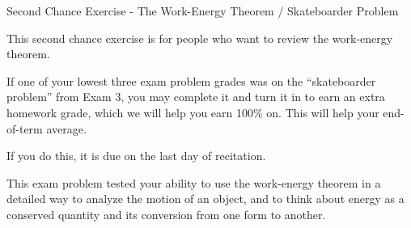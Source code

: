 \documentclass[12pt]{article}
\begin{document}
\begin{center}
\Large
\sc Second Chance Exercise - The Work-Energy Theorem / Skateboarder Problem \rm





\normalsize
This second chance exercise is for people who want to review the work-energy theorem.

If one of your lowest three exam problem grades was on the ``skateboarder problem'' from Exam 3, you may complete it and turn it in to earn an extra homework grade, which we will help you earn 100\% on. This will help your end-of-term average.

If you do this, it is due on the last day of recitation.

\end{center}

\vspace{1.5in}

This exam problem tested your ability to use the work-energy theorem in a detailed way to analyze the motion of an object, and to think about energy as a conserved quantity and its conversion from one form to another.
\end{document}

